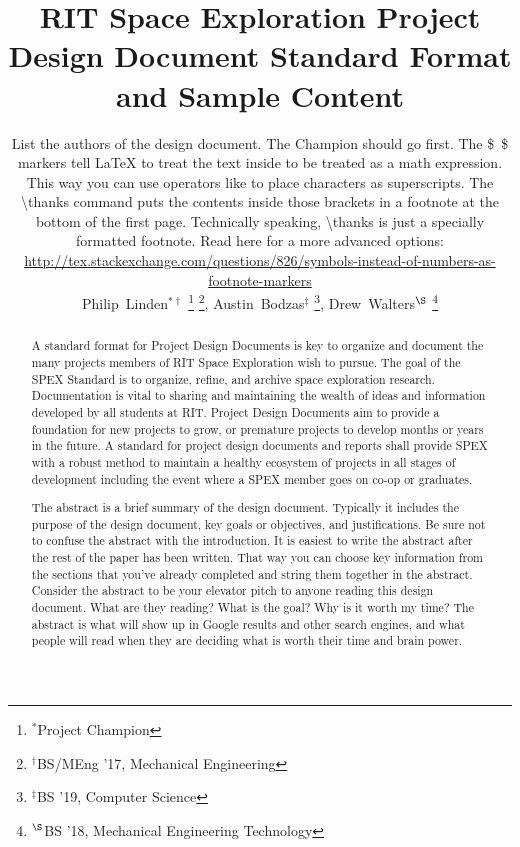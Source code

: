 \documentclass[journal]{SPEXformat}
\title{RIT Space Exploration Project Design Document Standard Format and Sample Content}
\author{
  \begin{help}
    List the authors of the design document. The Champion should go first.
    The \$~\$ markers tell \LaTeX{} to treat the text inside to be treated as a math expression. This way you can use operators like \textcaret{} to place characters as superscripts.
    The \textbackslash{}thanks command puts the contents inside those brackets in a footnote at the bottom of the first page. Technically speaking, \textbackslash{}thanks is just a specially formatted footnote.
    Read here for a more advanced options:  \url{http://tex.stackexchange.com/questions/826/symbols-instead-of-numbers-as-footnote-markers}
  \end{help}
  Philip~Linden$^{*\dagger}$%
    \thanks{$^{*}$Project Champion}%
    \thanks{$^{\dagger}$BS/MEng '17, Mechanical Engineering},
  Austin~Bodzas$^{\ddagger}$%
    \thanks{$^{\ddagger}$BS '19, Computer Science},
  Drew~Walters$^{\S}$%
    \thanks{$^{\S}$BS '18, Mechanical Engineering Technology}
}
\newenvironment{help}{
  \ttfamily\footnotesize\sloppy
  \begin{lrbox}{\helpbox}\begin{minipage}{\linewidth}
  }{
  \end{minipage}\end{lrbox}
  \ifbool{showhelp}{
    \fbox{\usebox{\helpbox}}
  }{}
}
\begin{document}
\maketitle%

\begin{abstract}
  A standard format for Project Design Documents is key to organize and document the many projects members of RIT Space Exploration wish to pursue.
  The goal of the SPEX Standard is to organize, refine, and archive space exploration research.
  Documentation is vital to sharing and maintaining the wealth of ideas and information developed by all students at RIT.\@
  Project Design Documents aim to provide a foundation for new projects to grow, or premature projects to develop months or years in the future.
  A standard for project design documents and reports shall provide SPEX with a robust method to maintain a healthy ecosystem of projects in all stages of development including the event where a SPEX member goes on co-op or graduates.
    \begin{help}
      The abstract is a brief summary of the design document. Typically it includes the purpose of the design document, key goals or objectives, and justifications.
      Be sure not to confuse the abstract with the introduction.
      It is easiest to write the abstract after the rest of the paper has been written.
      That way you can choose key information from the sections that you've already completed and string them together in the abstract.
      Consider the abstract to be your elevator pitch to anyone reading this design document.
      What are they reading?
      What is the goal?
      Why is it worth my time?
      The abstract is what will show up in Google results and other search engines, and what people will read when they are deciding what is worth their time and brain power.
    \end{help}
\end{abstract}
\end{document}
